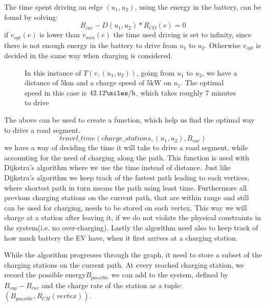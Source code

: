 The time spent driving an edge $(u_1, u_2)$, using the energy in the battery, can be found by solving:
\[B_{cur} - D(u_1, u_2) * R_{CO}(v) = 0\] 
if $v_{opt}(e)$ is lower than $v_{min}(e)$ the time used driving is set to infinity, since there is not enough energy in the battery to drive from $u_1$ to $u_2$. Otherwise $v_{opt}$ is decided in the same way when charging is considered.

\begin{figure}[!htb]
\label{fig:graph}
% 
\caption{In this instance of $T(v,(u_1, u_2))$, going from $u_1$ to $u_2$, we have a distance of $5 \si{\km}$ and a charge speed of $5 \si{\kW}$ on $u_1$. The optimal speed in this case is $42.12\si{\miles\per\hour}$, which takes roughly 7 minutes to drive}
\end{figure}

The above can be used to create a function, which help us find the optimal way to drive a road segment. 
\[travel\_time(charge\_stations, (u_1, u_2), B_{cur}) \]
we have a way of deciding the time it will take to drive a road segment, while accounting for the need of charging along the path. This function is used with Dijkstra's algorithm where we use the time instead of distance. Just like Dijkstra's algorithm we keep track of the fastest path leading to each vertices, where shortest path in turn means the path using least time. Furthermore all previous charging stations on the current path, that are within range and still can be used for charging, needs to be stored on each vertex. This way we will charge at a station after leaving it, if we do not violate the physical constraints in the system(i.e. no over-charging). Lastly the algorithm need also to keep track of how much battery the EV have, when it first arrives at a charging station.

While the algorithm progresses through the graph, it need to store a subset of the charging stations on the current path. At every reached charging station, we record the possible energy$B_{possible}$ we can add to the system, defined by $B_{cap}-B_{cur}$ and the charge rate of the station as a tuple: $(B_{possible}, R_{CH}(vertex))$.

